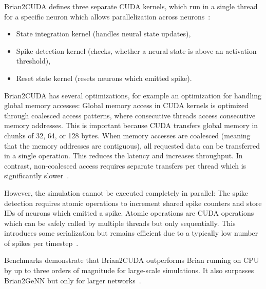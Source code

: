 Brian2CUDA defines three separate CUDA kernels, which run in a single thread for a specific neuron which allows parallelization across neurons~\cite{alevi_brian2cuda_2022}:
\begin{itemize}
    \item State integration kernel (handles neural state updates),
    \item Spike detection kernel (checks, whether a neural state is above an activation threshold),
    \item Reset state kernel (resets neurons which emitted spike).
\end{itemize}

Brian2CUDA has several optimizations, for example an optimization for handling global memory accesses:
Global memory access in CUDA kernels is optimized through coalesced access patterns, where consecutive threads access consecutive memory addresses.
This is important because CUDA transfers global memory in chunks of 32, 64, or 128 bytes.
When memory accesses are coalesced (meaning that the memory addresses are contiguous), all requested data can be transferred in a single operation.
This reduces the latency and increases throughput.
In contrast, non-coalesced access requires separate transfers per thread which is significantly slower~\cite{alevi_brian2cuda_2022}.

However, the simulation cannot be executed completely in parallel:
The spike detection requires atomic operations to increment shared spike counters and store IDs of neurons which emitted a spike.
Atomic operations are CUDA operations which can be safely called by multiple threads but only sequentially.
This introduces some serialization but remains efficient due to a typically low number of spikes per timestep~\cite{alevi_brian2cuda_2022}.  
 
Benchmarks demonstrate that Brian2CUDA outperforms Brian running on \ac{CPU} by up to three orders of magnitude for large-scale simulations.
It also surpasses Brian2GeNN but only for larger networks~\cite{alevi_brian2cuda_2022}. 

